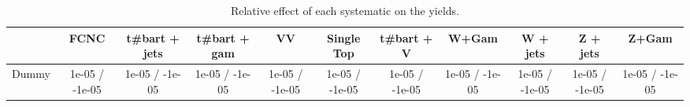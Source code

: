 \begin{table}[htbp]
\begin{center}
\footnotesize
\begin{tabular}{|c|c|c|c|c|c|c|c|c|c|c|}
\hline 
      & FCNC      & t#bar{t} + jets      & t#bar{t} +  gam      & VV      & Single Top      & t#bar{t} + V      & W+Gam      & W + jets      & Z + jets      & Z+Gam \\ 
\hline 
  Dummy & 1e-05 / -1e-05 & 1e-05 / -1e-05 & 1e-05 / -1e-05 & 1e-05 / -1e-05 & 1e-05 / -1e-05 & 1e-05 / -1e-05 & 1e-05 / -1e-05 & 1e-05 / -1e-05 & 1e-05 / -1e-05 & 1e-05 / -1e-05 \\ 
\hline 
\end{tabular} 
\caption{Relative effect of each systematic on the yields.} 
\end{center} 
\end{table} 
